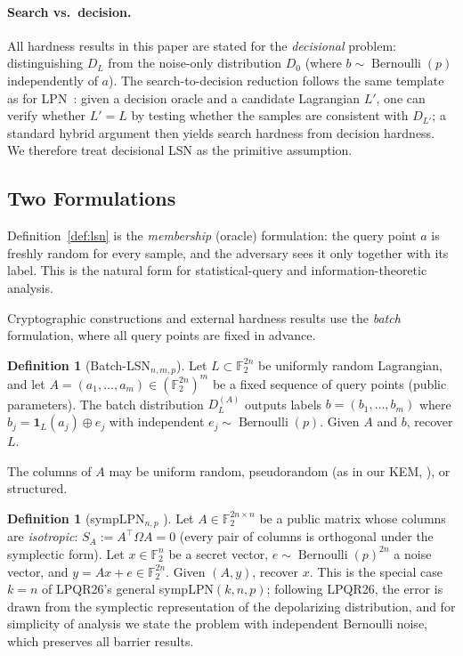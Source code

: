 \documentclass[11pt,a4paper]{article}
\theoremstyle{plain}
\theoremstyle{definition}
\newtheorem{definition}[theorem]{Definition}
\newcommand{\F}{\mathbb{F}}
\begin{document}
\paragraph{Search vs.~decision.} All hardness results in this paper are stated for the \emph{decisional} problem: distinguishing $D_L$ from the noise-only distribution $D_0$ (where $b \sim \operatorname{Bernoulli}(p)$ independently of $a$). The search-to-decision reduction follows the same template as for LPN~\cite{BFKL94}: given a decision oracle and a candidate Lagrangian $L'$, one can verify whether $L'=L$ by testing whether the samples are consistent with $D_{L'}$; a standard hybrid argument then yields search hardness from decision hardness. We therefore treat decisional LSN as the primitive assumption.

\subsection{Two Formulations}
\label{subsec:two-forms}

Definition~\ref{def:lsn} is the \emph{membership} (oracle) formulation: the query point $a$ is freshly random for every sample, and the adversary sees it only together with its label. This is the natural form for statistical-query and information-theoretic analysis.

Cryptographic constructions and external hardness results use the \emph{batch} formulation, where all query points are fixed in advance.

\begin{definition}[Batch-LSN$_{n,m,p}$]
\label{def:lsn-batch}
Let $L \subset \F_2^{2n}$ be uniformly random Lagrangian, and let $A = (a_1,\dots,a_m) \in (\F_2^{2n})^m$ be a fixed sequence of query points (public parameters). The batch distribution $D_L^{(A)}$ outputs labels $b = (b_1,\dots,b_m)$ where $b_j = \mathbf{1}_L(a_j) \oplus e_j$ with independent $e_j \sim \operatorname{Bernoulli}(p)$. Given $A$ and $b$, recover $L$.
\end{definition}

The columns of $A$ may be uniform random, pseudorandom (as in our KEM, ), or structured.

\begin{definition}[sympLPN$_{n,p}$ \cite{KLP+25,LPQR26}]
\label{def:symplpn}
Let $A \in \F_2^{2n \times n}$ be a public matrix whose columns are \emph{isotropic}: $S_A := A^{\top}\Omega A = 0$ (every pair of columns is orthogonal under the symplectic form). Let $x \in \F_2^n$ be a secret vector, $e \sim \operatorname{Bernoulli}(p)^{2n}$ a noise vector, and $y = Ax + e \in \F_2^{2n}$. Given $(A,y)$, recover $x$.
This is the special case $k=n$ of LPQR26's general sympLPN$(k,n,p)$; following LPQR26, the error is drawn from the symplectic representation of the depolarizing distribution, and for simplicity of analysis we state the problem with independent Bernoulli noise, which preserves all barrier results.
\end{definition}
\end{document}
